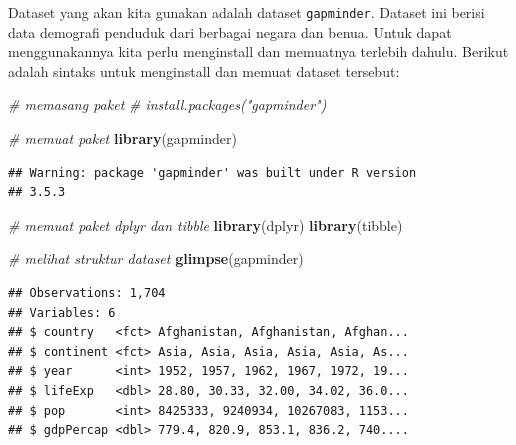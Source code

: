 \documentclass[]{book}
\newenvironment{Shaded}{\begin{snugshade}}{\end{snugshade}}
\newcommand{\KeywordTok}[1]{\textcolor[rgb]{0.13,0.29,0.53}{\textbf{#1}}}
\newcommand{\CommentTok}[1]{\textcolor[rgb]{0.56,0.35,0.01}{\textit{#1}}}
\newcommand{\OperatorTok}[1]{\textcolor[rgb]{0.81,0.36,0.00}{\textbf{#1}}}
\newcommand{\NormalTok}[1]{#1}
\begin{document}
Dataset yang akan kita gunakan adalah dataset \texttt{gapminder}.
Dataset ini berisi data demografi penduduk dari berbagai negara dan
benua. Untuk dapat menggunakannya kita perlu menginstall dan memuatnya
terlebih dahulu. Berikut adalah sintaks untuk menginstall dan memuat
dataset tersebut:

\begin{Shaded}
\begin{Highlighting}[]
\CommentTok{# memasang paket}
\CommentTok{# install.packages("gapminder")}

\CommentTok{# memuat paket}
\KeywordTok{library}\NormalTok{(gapminder)}
\end{Highlighting}
\end{Shaded}

\begin{verbatim}
## Warning: package 'gapminder' was built under R version
## 3.5.3
\end{verbatim}

\begin{Shaded}
\begin{Highlighting}[]
\CommentTok{# memuat paket dplyr dan tibble}
\KeywordTok{library}\NormalTok{(dplyr)}
\KeywordTok{library}\NormalTok{(tibble)}
\end{Highlighting}
\end{Shaded}

\begin{Shaded}
\begin{Highlighting}[]
\CommentTok{# melihat struktur dataset}
\KeywordTok{glimpse}\NormalTok{(gapminder)}
\end{Highlighting}
\end{Shaded}

\begin{verbatim}
## Observations: 1,704
## Variables: 6
## $ country   <fct> Afghanistan, Afghanistan, Afghan...
## $ continent <fct> Asia, Asia, Asia, Asia, Asia, As...
## $ year      <int> 1952, 1957, 1962, 1967, 1972, 19...
## $ lifeExp   <dbl> 28.80, 30.33, 32.00, 34.02, 36.0...
## $ pop       <int> 8425333, 9240934, 10267083, 1153...
## $ gdpPercap <dbl> 779.4, 820.9, 853.1, 836.2, 740....
\end{verbatim}

\begin{Shaded}
\end{Shaded}
\end{document}
